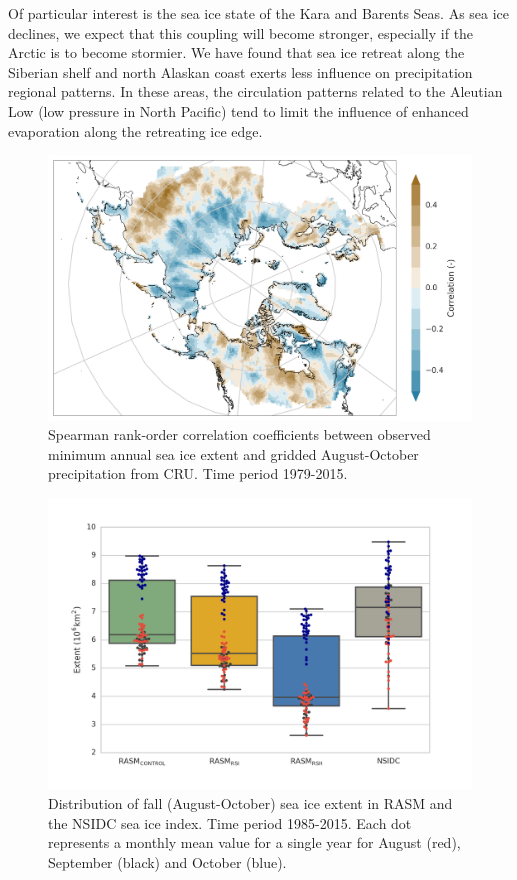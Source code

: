 \documentclass[draft,linenumbers]{agujournal}
\begin{document}
Of particular interest is the sea ice state of the Kara and Barents Seas.
As sea ice declines, we expect that this coupling will become stronger, especially if the Arctic is to become stormier.
We have found that sea ice retreat along the Siberian shelf and north Alaskan coast exerts less influence on precipitation regional patterns.
In these areas, the circulation patterns related to the Aleutian Low (low pressure in North Pacific) tend to limit the influence of enhanced evaporation along the retreating ice edge.

\clearpage
\begin{figure}
  \centering
  \includegraphics[width=12cm,keepaspectratio]{cru_correlation}
  \caption{Spearman rank-order correlation coefficients between observed minimum annual sea ice extent and gridded August-October precipitation from CRU. Time period 1979-2015.}
  \label{fig:prec_spatial_corr}
\end{figure}

\clearpage
\begin{figure}
  \centering
  \includegraphics[width=12cm,keepaspectratio]{seaice_boxplots}
  \caption{Distribution of fall (August-October) sea ice extent in RASM and the NSIDC sea ice index. Time period 1985-2015. Each dot represents a monthly mean value for a single year for August (red), September (black) and October (blue).}
  \label{fig:sea_ice_box}
\end{figure}
\end{document}
